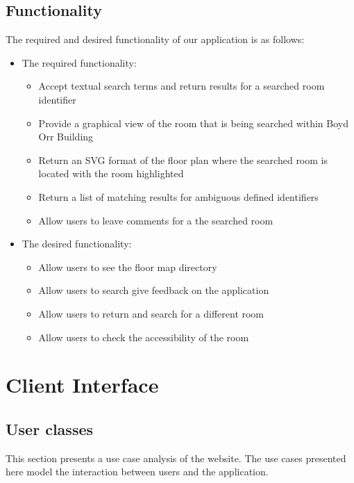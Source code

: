 \documentclass{sig-alt-release2}
\begin{document}
\subsection{Functionality}
The required and desired functionality of our application is as follows:
\begin{itemize} \itemsep1pt \parskip0pt 
	\item The required functionality:
	\begin{itemize} \itemsep1pt \parskip0pt 
		\item Accept textual search terms and return results for a searched
		room identifier 
		
		\item Provide a graphical view of the room that is being searched
		within Boyd Orr Building
		
		\item Return an SVG format of the floor plan where the searched
		room is located with the room highlighted
		
		\item Return a list of matching results for ambiguous defined
		identifiers
		
		\item Allow users to leave comments for a the searched room		
	\end{itemize}

	\item The desired functionality:
	\begin{itemize} \itemsep1pt \parskip0pt 
		\item Allow users to see the floor map directory
		\item Allow users to search give feedback on the application
		\item Allow users to return and search for a different room
		\item Allow users to check the accessibility of the room
	\end{itemize}
\end{itemize}

\section{Client Interface}

\subsection*{User classes}
This section presents a use case analysis of the website. The use cases 
presented here model the interaction between users and the application.
\end{document}
